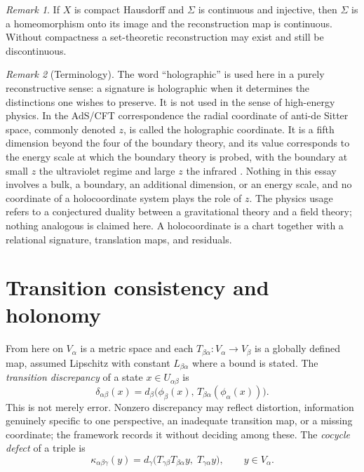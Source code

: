 \documentclass[11pt]{article}
\theoremstyle{remark}
\newtheorem{remark}{Remark}
\begin{document}
\begin{remark}
If $X$ is compact Hausdorff and $\Sigma$ is continuous and injective, then $\Sigma$ is a homeomorphism onto its image and the reconstruction map is continuous. Without compactness a set-theoretic reconstruction may exist and still be discontinuous.
\end{remark}

\begin{remark}[Terminology]\label{rem:term}
The word ``holographic'' is used here in a purely reconstructive sense: a signature is holographic when it determines the distinctions one wishes to preserve. It is not used in the sense of high-energy physics. In the AdS/CFT correspondence \cite{maldacena} the radial coordinate of anti-de Sitter space, commonly denoted $z$, is called the holographic coordinate. It is a fifth dimension beyond the four of the boundary theory, and its value corresponds to the energy scale at which the boundary theory is probed, with the boundary at small $z$ the ultraviolet regime and large $z$ the infrared \cite{susskind}. Nothing in this essay involves a bulk, a boundary, an additional dimension, or an energy scale, and no coordinate of a holocoordinate system plays the role of $z$. The physics usage refers to a conjectured duality between a gravitational theory and a field theory; nothing analogous is claimed here. A holocoordinate is a chart together with a relational signature, translation maps, and residuals.
\end{remark}

\section{Transition consistency and holonomy}

From here on $V_\alpha$ is a metric space and each $T_{\beta\alpha}:V_\alpha\to V_\beta$ is a globally defined map, assumed Lipschitz with constant $L_{\beta\alpha}$ where a bound is stated. The \emph{transition discrepancy} of a state $x\in U_{\alpha\beta}$ is
\[
\delta_{\alpha\beta}(x)=d_\beta\bigl(\phi_\beta(x),\,T_{\beta\alpha}(\phi_\alpha(x))\bigr).
\]
This is not merely error. Nonzero discrepancy may reflect distortion, information genuinely specific to one perspective, an inadequate transition map, or a missing coordinate; the framework records it without deciding among these. The \emph{cocycle defect} of a triple is
\[
\kappa_{\alpha\beta\gamma}(y)=d_\gamma\bigl(T_{\gamma\beta}T_{\beta\alpha}y,\;T_{\gamma\alpha}y\bigr),\qquad y\in V_\alpha .
\]
\end{document}
